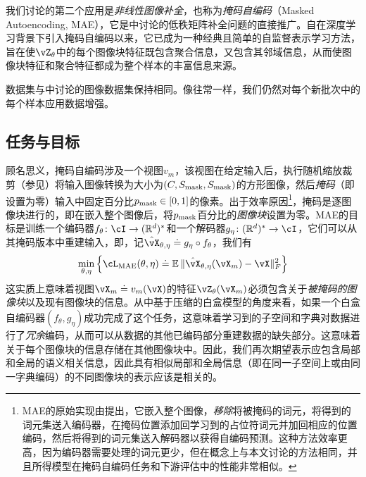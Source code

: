 \documentclass[../../book-main.tex]{subfiles}
\begin{document}
我们讨论的第二个应用是\textit{非线性图像补全}，也称为\textit{掩码自编码}（Masked Autoencoding, MAE），它是中讨论的低秩矩阵补全问题的直接推广。自\cite{he2022masked}在深度学习背景下引入掩码自编码以来，它已成为一种经典且简单的自监督表示学习方法，旨在使\(\vZ_{\theta}\)中的每个图像块特征既包含聚合信息，又包含其邻域信息，从而使图像块特征和聚合特征都成为整个样本的丰富信息来源。

数据集与中讨论的图像数据集保持相同。像往常一样，我们仍然对每个新批次中的每个样本应用数据增强。

\subsection{任务与目标}\label{sub:image_completion_objective}

顾名思义，掩码自编码涉及一个视图\(v_{m}\)，该视图在给定输入后，执行随机缩放裁剪（参见）将输入图像转换为大小为\((C, S_{\mathrm{mask}}, S_{\mathrm{mask}})\)的方形图像，然后\textit{掩码}（即设置为零）输入中固定百分比\(p_{\mathrm{mask}} \in [0, 1]\)的像素。出于效率原因\footnote{MAE的原始实现由\cite{he2022masked}提出，它嵌入整个图像，\textit{移除}将被掩码的词元，将得到的词元集送入编码器，在掩码位置添加回学习到的占位符词元并加回相应的位置编码，然后将得到的词元集送入解码器以获得自编码预测。这种方法效率更高，因为编码器需要处理的词元更少，但在概念上与本文讨论的方法相同，并且所得模型在掩码自编码任务和下游评估中的性能非常相似。}，掩码是逐图像块进行的，即在嵌入整个图像后，将\(p_{\mathrm{mask}}\)百分比的\textit{图像块}设置为零。MAE的目标是训练一个编码器\(f_{\theta} \colon \cI \to (\R^{d})^{*}\)和一个解码器\(g_{\eta} \colon (\R^{d})^{*} \to \cI\)，它们可以从其掩码版本中重建输入，即，记\(\hat{\vX}_{\theta, \eta} \doteq g_{\eta} \circ f_{\theta}\)，我们有
\begin{equation}
    \min_{\theta, \eta}\bc{\cL_{\mathrm{MAE}}(\theta, \eta) \doteq \Ex\norm{\hat{\vX}_{\theta, \eta}(\vX_{m}) - \vX}_{F}^{2}}
\end{equation}
这实质上意味着视图\(\vX_{m} \doteq v_{m}(\vX)\)的特征\(\vZ_{\theta}(\vX_{m})\)必须包含关于\textit{被掩码的图像块}以及现有图像块的信息。从中基于压缩的白盒模型的角度来看，如果一个白盒自编码器\((f_{\theta}, g_{\eta})\)成功完成了这个任务，这意味着学习到的子空间和字典对数据进行了\textit{冗余}编码，从而可以从数据的其他已编码部分重建数据的缺失部分。这意味着关于每个图像块的信息存储在其他图像块中。因此，我们再次期望表示应包含局部和全局的语义相关信息，因此具有相似局部和全局信息（即在同一子空间上或由同一字典编码）的不同图像块的表示应该是相关的。
\end{document}
